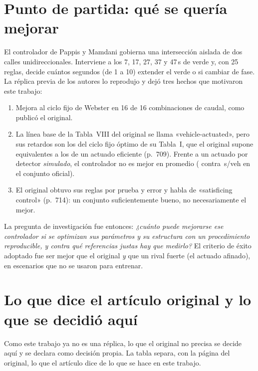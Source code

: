 \documentclass[11pt,a4paper]{article}
\begin{document}
\section{Punto de partida: qué se quería mejorar}
\label{sec:partida}

El controlador de Pappis y Mamdani \cite{Pappis1977} gobierna una intersección aislada de dos calles unidireccionales. Interviene a los 7, 17, 27, 37 y 47\,s de verde y, con 25 reglas, decide cuántos segundos (de 1 a 10) extender el verde o si cambiar de fase. La réplica previa de los autores lo reprodujo y dejó tres hechos que motivaron este trabajo:
\begin{enumerate}
\item Mejora al ciclo fijo de Webster en 16 de 16 combinaciones de caudal, como publicó el original.
\item La línea base de la Tabla~VIII del original se llama «vehicle-actuated», pero sus retardos son los del ciclo fijo óptimo de su Tabla~I, que el original supone equivalentes a los de un actuado eficiente (p.~709). Frente a un actuado por detector \emph{simulado}, el controlador no es mejor en promedio (\DelayOfPap{} contra \DelayOfAct{}\,s/veh en el conjunto oficial).
\item El original obtuvo sus reglas por prueba y error y habla de «satisficing control» (p.~714): un conjunto suficientemente bueno, no necesariamente el mejor.
\end{enumerate}
La pregunta de investigación fue entonces: \emph{¿cuánto puede mejorarse ese controlador si se optimizan sus parámetros y su estructura con un procedimiento reproducible, y contra qué referencias justas hay que medirlo?} El criterio de éxito adoptado fue ser mejor que el original \emph{y} que un rival fuerte (el actuado afinado), en escenarios que no se usaron para entrenar.

\section{Lo que dice el artículo original y lo que se decidió aquí}
\label{sec:original}

Como este trabajo ya no es una réplica, lo que el original no precisa se decide aquí y se declara como decisión propia. La tabla separa, con la página del original, lo que el artículo dice de lo que se hace en este trabajo.
\end{document}
